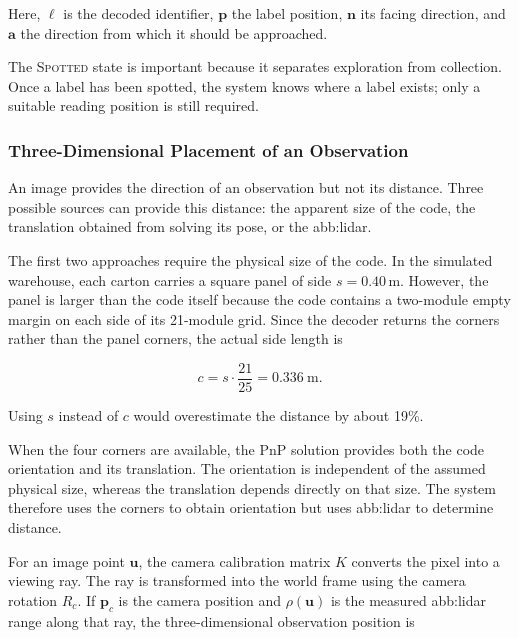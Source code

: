 \FloatBarrier

Here, $\ell$ is the decoded identifier, $\mathbf{p}$ the label position,
$\mathbf{n}$ its facing direction, and $\mathbf{a}$ the direction from which it
should be approached.

The \textsc{Spotted} state is important because it separates exploration from
collection. Once a label has been spotted, the system knows where a label exists;
only a suitable reading position is still required.

\subsubsection*{Three-Dimensional Placement of an Observation}

An image provides the direction of an observation but not its distance. Three
possible sources can provide this distance: the apparent size of the
 code, the translation obtained from solving its pose, or the
\gls{abb:lidar}.

The first two approaches require the physical size of the code. In the simulated
warehouse, each carton carries a square panel of side $s = 0.40$\,m. However, the
panel is larger than the  code itself because the code
contains a two-module empty margin on each side of its 21-module grid. Since the
decoder returns the  corners rather than the panel corners,
the actual  side length is

\begin{equation}
    c = s \cdot \frac{21}{25} = 0.336\ \text{m}.
    \label{eq:sys:codeside}
\end{equation}

Using $s$ instead of $c$ would overestimate the distance by about 19\%.

When the four  corners are available, the PnP solution
provides both the code orientation and its translation. The orientation is
independent of the assumed physical size, whereas the translation depends
directly on that size. The system therefore uses the corners to obtain
orientation but uses \gls{abb:lidar} to determine distance.

For an image point $\mathbf{u}$, the camera calibration matrix $K$ converts the
pixel into a viewing ray. The ray is transformed into the world frame using the
camera rotation $R_c$. If $\mathbf{p}_c$ is the camera position and
$\rho(\mathbf{u})$ is the measured \gls{abb:lidar} range along that ray, the
three-dimensional observation position is

